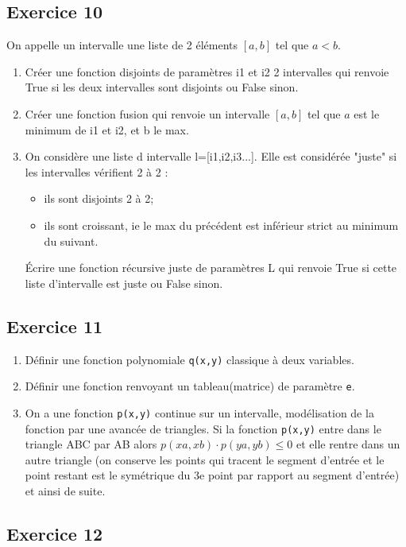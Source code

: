 \subsection*{Exercice 10}
On appelle un intervalle une liste de 2 éléments $[a,b]$ tel que $a <b$.

\begin{enumerate}
\item Créer une fonction disjoints de paramètres i1 et i2 2 intervalles qui renvoie True si les deux intervalles sont disjoints ou False sinon.
\item Créer une fonction fusion qui renvoie un intervalle $[a,b]$ tel que $a$ est le minimum de i1 et i2, et b le max.
\item On considère une liste d intervalle l=[i1,i2,i3...]. Elle est considérée "juste" si les intervalles vérifient 2 à 2 :
\begin{itemize}
\item ils sont disjoints 2 à 2;
\item ils sont croissant, ie le max du précédent est inférieur strict au minimum du suivant.
\end{itemize}

Écrire une fonction récursive juste de paramètres L qui renvoie True si cette liste d'intervalle est juste ou False sinon.
\end{enumerate}


\subsection*{Exercice 11}

\begin{enumerate}
\item Définir une fonction polynomiale \texttt{q(x,y)} classique à deux variables.
\item Définir une fonction renvoyant un tableau(matrice) de paramètre \texttt{e}.
\item On a une fonction \texttt{p(x,y)} continue sur un intervalle, modélisation de la fonction par une avancée de triangles. Si la fonction \texttt{p(x,y)} entre dans le triangle ABC par AB alors $p(xa,xb)\cdot p(ya,yb)\leq 0$ et elle rentre dans un autre triangle (on conserve les points qui tracent le segment d'entrée et le point restant est le symétrique du 3e point par rapport au segment d'entrée) et ainsi de suite.
\end{enumerate}


\subsection*{Exercice 12}

